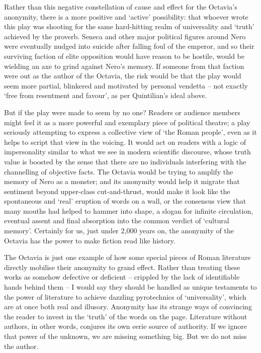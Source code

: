 \documentclass[../main.tex]{subfiles}
\begin{document}
\begin{multicols}{2}
Rather than this negative constellation of cause and effect for the Octavia’s anonymity, there is a more positive and ‘active’ possibility: that whoever wrote this play was shooting for the same hard-hitting realm of universality and ‘truth’ achieved by the proverb. Seneca and other major political figures around Nero were eventually nudged into suicide after falling foul of the emperor, and so their surviving faction of elite opposition would have reason to be hostile, would be wielding an axe to grind against Nero’s memory. If someone from that faction were out as the author of the Octavia, the risk would be that the play would seem more partial, blinkered and motivated by personal vendetta – not exactly ‘free from resentment and favour’, as per Quintilian’s ideal above. 

But if the play were made to seem by no one? Readers or audience members might feel it as a more powerful and exemplary piece of political theatre; a play seriously attempting to express a collective view of ‘the Roman people’, even as it helps to script that view in the voicing. It would act on readers with a logic of impersonality similar to what we see in modern scientific discourse, whose truth value is boosted by the sense that there are no individuals interfering with the channelling of objective facts. The Octavia would be trying to amplify the memory of Nero as a monster; and its anonymity would help it migrate that sentiment beyond upper-class cut-and-thrust, would make it look like the spontaneous and ‘real’ eruption of words on a wall, or the consensus view that many mouths had helped to hammer into shape, a slogan for infinite circulation, eventual assent and final absorption into the common verdict of ‘cultural memory’. Certainly for us, just under 2,000 years on, the anonymity of the Octavia has the power to make fiction read like history. 

The Octavia is just one example of how some special pieces of Roman literature directly mobilise their anonymity to grand effect. Rather than treating these works as somehow defective or deficient – crippled by the lack of identifiable hands behind them – I would say they should be handled as unique testaments to the power of literature to achieve dazzling pyrotechnics of ‘universality’, which are at once both real and illusory. Anonymity has its strange ways of convincing the reader to invest in the ‘truth’ of the words on the page. Literature without authors, in other words, conjures its own eerie source of authority. If we ignore that power of the unknown, we are missing something big. But we do not miss the author. 


\end{multicols}
\end{document}
